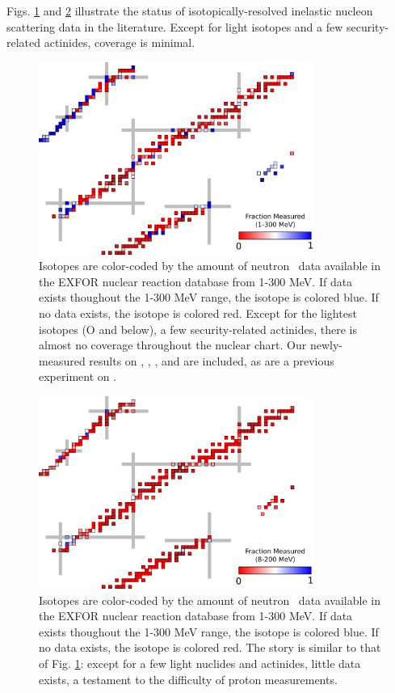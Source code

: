 Figs. \ref{TCSChart} and \ref{RCSChart} illustrate the status of isotopically-resolved inelastic
nucleon scattering data in the literature. Except for light isotopes and a few security-related
actinides, coverage is minimal.

\begin{figure}
    \includegraphics[width=0.8\textwidth]{figures/TCSChart.png}
    \caption[Landscape of existing neutron \tot\ data]
    {Isotopes are color-coded by the amount of neutron \tot\ data available in the EXFOR nuclear
        reaction database from 1-300 MeV. If data exists thoughout the 1-300 MeV range, the isotope
        is colored blue. If no data exists, the isotope is colored red. Except for the lightest
        isotopes (O and below), a few security-related actinides, there is almost no coverage
        throughout the nuclear chart. Our newly-measured results on \oSixEight, \niEightFour,
        \rhThree, and \snTwelveFour are included, as are a previous experiment on
        \caAughtEight \cite{Shane2010}.
    }
    \label{TCSChart}
\end{figure}

\begin{figure}
    \includegraphics[width=0.8\textwidth]{figures/RCSChart.png}
    \caption[Landscape of existing proton \rxn\ data (per the EXFOR database)]
    { Isotopes are color-coded by the amount of neutron \tot\ data available in the EXFOR nuclear
        reaction database from 1-300 MeV. If data exists thoughout the 1-300 MeV range, the isotope
        is colored blue. If no data exists, the isotope is colored red. The story is similar to that
        of Fig. \ref{TCSChart}: except for a few light nuclides and actinides, little data exists, a
    testament to the difficulty of proton \rxn measurements.}
    \label{RCSChart}
\end{figure}

